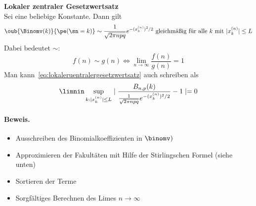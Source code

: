\begin{satz}
    \textbf{Lokaler zentraler Gesetzwertsatz}  \\
    Sei  eine beliebige Konstante.
    Dann gilt
    \begin{equation}
        \label{eq:lokaleruentralergesetzwertsatz}
        \oub{\Binomv(k)}{\pe(\sn = k)} \sim \frac{1}{\sqrt{2 \pi npq}} e^{-(x_k^{(n)})^2 / 2} \text{ gleichmäßig für alle $k$ mit }  |x_k^{(n)}| \leq L
    \end{equation}
    Dabei bedeutet $\sim$:
    \[
        f(n) \sim g(n) \Leftrightarrow \lim_{n \rightarrow \infty} \frac{f(n)}{g(n)}  = 1
    \]
    Man kann~\ref{eq:lokaleruentralergesetzwertsatz} auch schreiben als
    \[
        \limnin \sup_{k: |x_k^{(n)}| \leq L} \mid \frac{{B}_{n,p}(k)}{\frac{1}{\sqrt{2 \pi npq}} e^{-(x_k^{(n)})^2 / 2}}  - 1 \mid = 0
    \]

    \paragraph{Beweis.}
    \begin{itemize}
        \item Ausschreiben des Binomialkoeffizienten in $\binomv)$
        \item Approximieren der Fakultäten mit Hilfe der Stirlingschen Formel (siehe unten)
        \item Sortieren der Terme
        \item Sorgfältiges Berechnen des Limes $n \to \infty$
    \end{itemize}
\end{satz}

